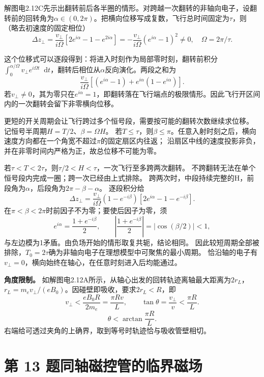 \documentclass[UTF8,fontset=fandol,a4paper,11pt]{ctexart}
\newcommand{\dd}{\mathop{}\!\mathrm{d}}
\newcommand{\result}[1]{\begin{equation*}\boxed{#1}\end{equation*}}
\begin{document}
解图电2.12C先示出翻转前后各半圈的情形。对跨越一次翻转的非轴向电子，设翻转前的回转角为$\alpha\in(0,2\pi)$。把横向位移写成复数，飞行总时间固定为$\tau$，则（略去初速度的固定相位）
\[
 \Delta z_\perp=\frac{v_\perp}{i\Omega}
 [2e^{i\alpha}-1-e^{2i\alpha}]
 =-\frac{v_\perp}{i\Omega}(e^{i\alpha}-1)^2\ne0,
 \quad\Omega=2\pi/\tau.
\]

这个位移式可以逐段得到：将进入时刻作为局部零时刻，翻转前积分$\int_0^{\alpha/\Omega}v_\perp e^{i\Omega t}\dd t$，翻转后相位从$\alpha$反向演化。两段之和为
\[
\frac{v_\perp}{i\Omega}
\left[(e^{i\alpha}-1)+e^{i\alpha}(1-e^{i\alpha})\right].
\]
若$v_\perp\ne0$，其为零只在$e^{i\alpha}=1$，即翻转落在飞行端点的极限情形。因此飞行开区间内的一次翻转会留下非零横向位移。

更短的开关周期会让飞行跨过多个恒号段，需要按可能的翻转次数继续求位移。
记恒号半周期$H=T/2$、$\beta=\Omega H$。
若$T\le\tau$，则$\beta\le\pi$。任意入射时刻之后，横向速度方向都在一个角宽不超过$\pi$的固定扇区内往返；
沿扇区中线的速度投影非负，并在非零时间内严格为正，故总位移不可能为零。

若$\tau<T<2\tau$，则$\tau/2<H<\tau$，一次飞行至多跨两次翻转。
不跨翻转无法在单个恒号段内完成一圈；跨一次已经由上式排除。
跨两次时，中段持续完整的H，前段角为$\alpha$，后段角为$2\pi-\beta-\alpha$。
逐段积分给
\[
\Delta z_\perp=\frac{v_\perp}{i\Omega}
(1-e^{-i\beta})[2e^{i\alpha}-1-e^{-i\beta}].
\]
在$\pi<\beta<2\pi$时前因子不为零；要使后因子为零，须
\[
e^{i\alpha}=\frac{1+e^{-i\beta}}2,\qquad
\left|\frac{1+e^{-i\beta}}2\right|=|\cos(\beta/2)|<1,
\]
与左边模为1矛盾。由负场开始的情形取复共轭，结论相同。
因此较短周期全部被排除，$T_0=2\tau$确为非轴向电子在理想模型中可聚焦的最小周期。
恰沿轴的电子有 $v_\perp=0$，横向始终在轴心，在任意时刻进入后均能通过。

\textbf{角度限制。} 如解图电2.12A所示，从轴心出发的回转轨迹离轴最大距离为$2r_L$，$r_L=m_ev_\perp/(eB_0)$。因碰壁即吸收，要求$2r_L<R$，即
\[
 v_\perp<\frac{eB_0R}{2m_e}=\frac{\pi Rv}{L},\qquad
 \tan\theta=\frac{v_\perp}{v}<\frac{\pi R}{L}.
\]
\result{\theta<\arctan\frac{\pi R}{L}.}
右端给可透过夹角的上确界，取到等号时轨迹恰与吸收管壁相切。



\section*{第 13 题\quad 同轴磁控管的临界磁场}\label{q:13}
\end{document}

